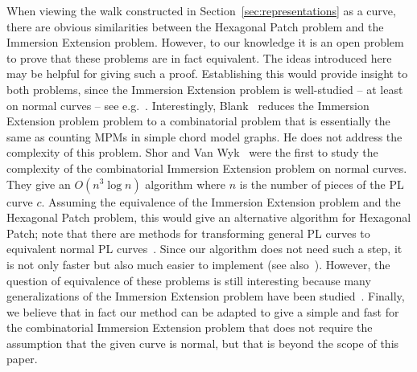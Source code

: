 \documentclass{llncs}
\begin{document}
When viewing the walk constructed in Section~\ref{sec:representations} as a curve, there are obvious similarities between the Hexagonal Patch problem and the Immersion Extension problem. However, to our knowledge it is an open problem to prove that these problems are in fact equivalent. 
The ideas introduced here may be helpful for giving such a proof.
Establishing this would provide insight to both problems, since
the Immersion Extension problem is well-studied -- at least on normal curves -- see e.g.~\cite{Bla67,EM08,SW92}. 
Interestingly, Blank~\cite{Bla67,Fra70} reduces the Immersion Extension problem problem to a combinatorial problem that is essentially the same as counting MPMs in simple chord model graphs. He does not address the complexity of this problem. Shor and Van Wyk~\cite{SW92} were the first to study the complexity of the combinatorial Immersion Extension problem on normal curves. They give an $O(n^3 \log n)$ algorithm where $n$ is the number of pieces of the PL curve $c$.
Assuming the equivalence of the Immersion Extension problem and the Hexagonal Patch problem, this would give an alternative algorithm for Hexagonal Patch; note that there are methods for transforming general PL curves to equivalent normal PL curves~\cite{Sei98}.
Since our algorithm does not need such a step, it is not only faster but also much easier to implement (see also~\cite{Sei98}).
However, the question of equivalence of these problems is still interesting because many generalizations of the Immersion Extension problem have been studied~\cite{EM08}.
Finally, we believe that in fact our method can be adapted to give a simple and fast 
for the combinatorial Immersion Extension problem that does not require the assumption that the given curve is normal, but that is beyond the scope of this paper.
\end{document}
